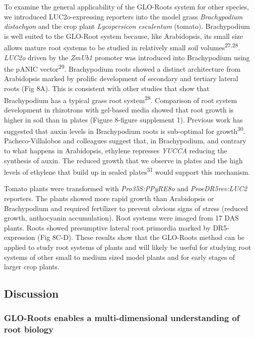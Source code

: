 \documentclass[]{article}
\begin{document}
To examine the general applicability of the GLO-Roots system for other
species, we introduced LUC2o-expressing reporters into the model grass
\emph{Brachypodium distachyon} and the crop plant \emph{Lycopersicon
esculentum} (tomato). Brachypodium is well suited to the GLO-Root system
because, like Arabidopsis, its small size allows mature root systems to
be studied in relatively small soil volumes\textsuperscript{27,28}.
\emph{LUC2o} driven by the \emph{ZmUb1} promoter was introduced into
Brachypodium using the pANIC vector\textsuperscript{29}. Brachypodium
roots showed a distinct architecture from Arabidopsis marked by prolific
development of secondary and tertiary lateral roots (Fig 8A). This is
consistent with other studies that show that Brachypodium has a typical
grass root system\textsuperscript{28}. Comparison of root system
development in rhizotrons with gel-based media showed that root growth
is higher in soil than in plates (Figure 8-figure supplement 1).
Previous work has suggested that auxin levels in Brachypodium roots is
sub-optimal for growth\textsuperscript{30}. Pacheco-Villalobos and
colleagues suggest that, in Brachypodium, and contrary to what happens
in Arabidopsis, ethylene represses \emph{YUCCA} reducing the synthesis
of auxin. The reduced growth that we observe in plates and the high
levels of ethylene that build up in sealed plates\textsuperscript{31}
would support this mechanism.

Tomato plants were transformed with \emph{Pro35S:PPyRE8o} and
\emph{ProeDR5rev:LUC2} reporters. The plants showed more rapid growth
than Arabidopsis or Brachypodium and required fertilizer to prevent
obvious signs of stress (reduced growth, anthocyanin accumulation). Root
systems were imaged from 17 DAS plants. Roots showed presumptive lateral
root primordia marked by DR5-expression (Fig 8C-D). These results show
that the GLO-Roots method can be applied to study root systems of plants
and will likely be useful for studying root systems of other small to
medium sized model plants and for early stages of larger crop plants.

\subsection{Discussion}\label{discussion}

\subsubsection{GLO-Roots enables a multi-dimensional understanding of
root
biology}\label{glo-roots-enables-a-multi-dimensional-understanding-of-root-biology}
\end{document}
